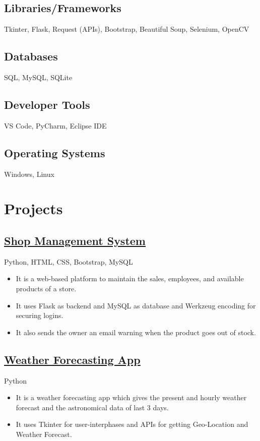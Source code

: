 \documentclass{article}
\begin{document}
\subsection{Libraries/Frameworks}
Tkinter, Flask, Request (APIs), Bootstrap, Beautiful Soup, Selenium, OpenCV
\subsection{Databases}
SQL, MySQL, SQLite
\subsection{Developer Tools}
VS Code, PyCharm, Eclipse IDE
\subsection{Operating Systems}
Windows, Linux

\section{Projects}
\vspace{-0.35cm}
\subsection{\href{https://github.com/TusharJ3011/Shop-Management-System}{\underline{Shop Management System}}}
{\faLaptop} \hspace{0.1in} Python, HTML, CSS, Bootstrap, MySQL
\vspace{-0.2cm}
\begin{itemize}
  \item It is a web-based platform to maintain the sales, employees, and available products of a store.
    \vspace{-0.3cm}
  \item It uses Flask as backend and MySQL as database and Werkzeug encoding for securing logins.
    \vspace{-0.3cm}
  \item It also sends the owner an email warning when the product goes out of stock.
\end{itemize}
\subsection{\href{https://github.com/TusharJ3011/Weather-Forecasting-App}{\underline{Weather Forecasting App}}}
{\faLaptop} \hspace{0.1in} Python
\vspace{-0.2cm}
\begin{itemize}
  \item It is a weather forecasting app which gives the present and hourly weather forecast and the astronomical data of last 3 days.
    \vspace{-0.3cm}
  \item It uses Tkinter for user-interphases and APIs for getting Geo-Location and Weather Forecast.
\end{itemize}
\end{document}
